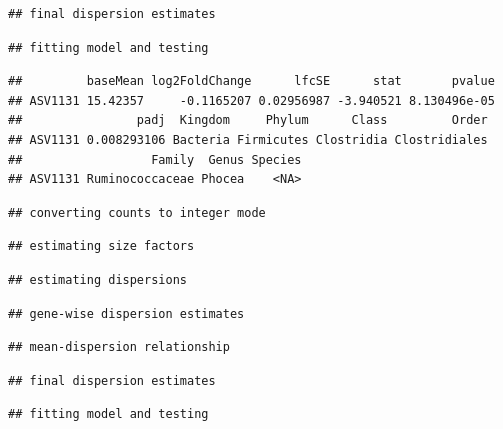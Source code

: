 \documentclass[]{article}
\begin{document}
\begin{verbatim}
## final dispersion estimates
\end{verbatim}

\begin{verbatim}
## fitting model and testing
\end{verbatim}

\begin{verbatim}
##         baseMean log2FoldChange      lfcSE      stat       pvalue
## ASV1131 15.42357     -0.1165207 0.02956987 -3.940521 8.130496e-05
##                padj  Kingdom     Phylum      Class         Order
## ASV1131 0.008293106 Bacteria Firmicutes Clostridia Clostridiales
##                  Family  Genus Species
## ASV1131 Ruminococcaceae Phocea    <NA>
\end{verbatim}

\begin{verbatim}
## converting counts to integer mode
\end{verbatim}

\begin{verbatim}
## estimating size factors
\end{verbatim}

\begin{verbatim}
## estimating dispersions
\end{verbatim}

\begin{verbatim}
## gene-wise dispersion estimates
\end{verbatim}

\begin{verbatim}
## mean-dispersion relationship
\end{verbatim}

\begin{verbatim}
## final dispersion estimates
\end{verbatim}

\begin{verbatim}
## fitting model and testing
\end{verbatim}
\end{document}
